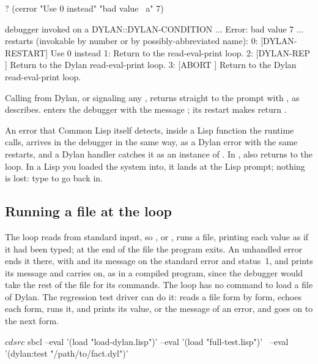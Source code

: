 \begin{repl}
? (cerror "Use 0 instead" "bad value ~a" 7)

debugger invoked on a DYLAN::DYLAN-CONDITION ...
  Error: bad value 7
...
restarts (invokable by number or by possibly-abbreviated name):
  0: [DYLAN-RESTART] Use 0 instead
  1:                 Return to the read-eval-print loop.
  2: [DYLAN-REP    ] Return to the Dylan read-eval-print loop.
  3: [ABORT        ] Return to the Dylan read-eval-print loop.
\end{repl}

\noindent
Calling  from Dylan, or signaling any ,
returns straight to the prompt with , as
 describes.  enters the
debugger with the message ; its
 restart makes  return .

\begin{notebox}
An error that Common Lisp itself detects, inside a Lisp function the
runtime calls, arrives in the debugger in the same way, as a Dylan error
with the same restarts, and a Dylan handler catches it as an instance of
. In ,  also returns to the
loop. In a Lisp you loaded the system into, it lands at the Lisp \code{*}
prompt; nothing is lost: type  to go back in.
\end{notebox}

\subsection{Running a file at the loop}\label{sec:lisp-test-file}

The loop reads from standard input, so , or
, runs a file, printing each value as if it had been typed; at the end of the
file the program exits. An unhandled error ends it there, with
 and its message on the standard error and status~1,
and  prints its message and carries on, as in a compiled
program, since the debugger would take the rest of the file for its
commands. The loop has no command to load a file of Dylan.
The regression test driver can do it:  reads a
file form by form, echoes each form, runs it, and prints its value, or
the message of an error, and goes on to the next form.

\begin{shell}
$ cd src
$ sbcl --eval '(load "load-dylan.lisp")' --eval '(load "full-test.lisp")' \
       --eval '(dylan:test "/path/to/fact.dyl")'
\end{shell}

